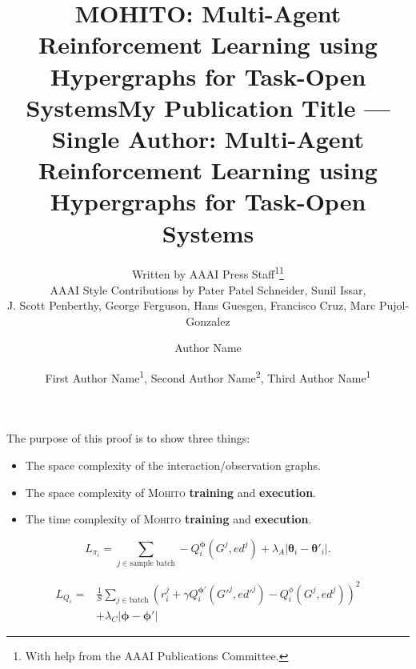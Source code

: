 \documentclass[letterpaper]{article} %
\title{MOHITO: Multi-Agent Reinforcement Learning using Hypergraphs for Task-Open Systems}
\author{
    Written by AAAI Press Staff\textsuperscript{\rm 1}\thanks{With help from the AAAI Publications Committee.}\\
    AAAI Style Contributions by Pater Patel Schneider,
    Sunil Issar,\\
    J. Scott Penberthy,
    George Ferguson,
    Hans Guesgen,
    Francisco Cruz\equalcontrib,
    Marc Pujol-Gonzalez\equalcontrib
}
\title{My Publication Title --- Single Author}
\author {
    Author Name
}
\title{\mohito{}: Multi-Agent Reinforcement Learning using Hypergraphs for Task-Open Systems}
\author {
    First Author Name\textsuperscript{\rm 1},
    Second Author Name\textsuperscript{\rm 2},
    Third Author Name\textsuperscript{\rm 1}
}
\newcommand{\mohito}{\textsc{Mohito}}
\begin{document}
\maketitle



The purpose of this proof is to show three things:
\begin{itemize}
    \item The space complexity of the interaction/observation graphs.
    \item The space complexity of \mohito{} \textbf{training} and \textbf{execution}.
    \item The time complexity of \mohito{} \textbf{training} and \textbf{execution}.
\end{itemize}



\begin{equation}
L_{\pi_i}=\sum_{j \in \text{sample batch}} -Q_i^{\bm{\phi}}(G^{j}, ed^j) + \lambda_A |\bm{\theta}_i - \bm{\theta}'_i|. %
    \label{eq:actor_pg}
\end{equation}


\begin{align}
        L_{Q_i}= & \frac{1}{S}\sum_{j\in \text{batch}} \left ( r_i^j + \gamma Q_i^{\bm{\phi}'}(G'^j, ed'^j) - Q_i^{\phi}(G^{j},ed^j) \right )^2 \nonumber\\ 
        & + \lambda_C |\bm{\phi} - \bm{\phi}'|
    \label{eq:critic-loss}
\end{align}
\end{document}
